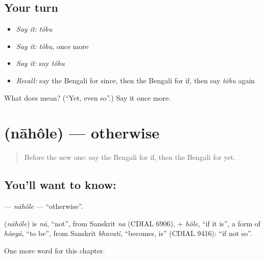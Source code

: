 \subsection*{Your turn}
\begin{itemize}
\raggedright
  \item \emph{Say it:} \emph{tôbu}
  \item \emph{Say it:} \emph{tôbu}, once more
  \item \emph{Say it:} say \emph{tôbu}
  \item \emph{Recall:} say the Bengali for since, then the Bengali for if, then say \emph{tôbu} again
\end{itemize}

\begin{tcolorbox}[breakable,colback=teal!4,colframe=teal!35!black,title={Before you move on}]
What does  mean? (\textquotedblleft{}Yet, even so\textquotedblright{}.) Say it once more.
\end{tcolorbox}
\section[\texorpdfstring{\bn{নাহলে} (nāhôle)}{নাহলে (nāhôle)}]{ (nāhôle) — otherwise}

\label{lesson:BN-C159-nahole}



\begin{quote}
Before the new one: say the Bengali for if, then the Bengali for yet.
\end{quote}

\subsection*{You'll want to know: }
\textbf{} — \emph{nāhôle} — \textquotedblleft{}otherwise\textquotedblright{}.

\begin{cousinweb}
\textbf{} (\emph{nāhôle}) is \emph{nā}, \textquotedblleft{}not\textquotedblright{}, from Sanskrit \emph{na} (CDIAL 6906), + \emph{hôle}, \textquotedblleft{}if it is\textquotedblright{}, a form of \emph{hôoyā}, \textquotedblleft{}to be\textquotedblright{}, from Sanskrit \emph{bhavati}, \textquotedblleft{}becomes, is\textquotedblright{} (CDIAL 9416): \textquotedblleft{}if not so\textquotedblright{}.
\end{cousinweb}

\begin{grammarlens}[title={What you've built}]
One more word for this chapter.
\end{grammarlens}

